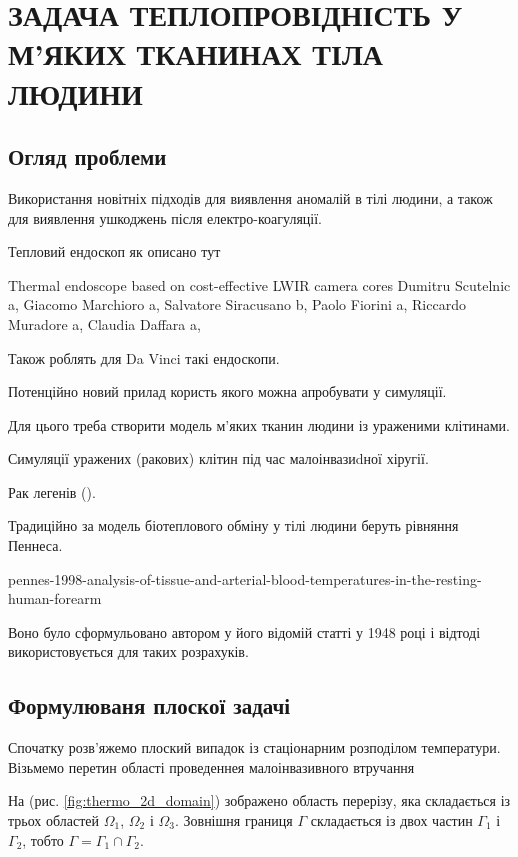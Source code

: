 \chapter{ЗАДАЧА ТЕПЛОПРОВІДНІСТЬ У М'ЯКИХ ТКАНИНАХ ТІЛА ЛЮДИНИ}

\nocite{bahvalov-et-al,benerdge-et-al,lung-cancer} 

\section{Огляд проблеми}

Використання новітніх підходів для виявлення аномалій в тілі людини, а також для виявлення ушкоджень після 
електро-коагуляції.

Тепловий ендоскоп як описано тут

Thermal endoscope based on cost-effective LWIR camera cores
Dumitru Scutelnic a, Giacomo Marchioro a, Salvatore Siracusano b, Paolo Fiorini a,
Riccardo Muradore a, Claudia Daffara a,

Також роблять для Da Vinci такі ендоскопи.

Потенційно новий прилад користь якого можна апробувати у симуляції.

Для цього треба створити модель м'яких тканин людини із ураженими клітинами. 

Симуляції уражених (ракових) клітин під час малоінвазиdної хіругії.

Рак легенів (\cite{lung-cancer}).

Традиційно за модель біотеплового обміну у тілі людини беруть рівняння Пеннеса.

pennes-1998-analysis-of-tissue-and-arterial-blood-temperatures-in-the-resting-human-forearm

Воно було сформульовано автором у його відомій статті у 1948 році і відтоді використовується для таких розрахуків.


\section{Формулюваня плоскої задачі}

Спочатку розв'яжемо плоский випадок із стаціонарним розподілом температури.
Візьмемо перетин області проведеннея малоінвазивного втручання

На (рис. \ref{fig:thermo_2d_domain}) зображено область перерізу, яка складається із трьох областей $\Omega_1$, 
$\Omega_2$ і $\Omega_3$. Зовнішня границя $\Gamma$ складається із двох частин $\Gamma_1$ і $\Gamma_2$, тобто 
$\Gamma=\Gamma_1\cap\Gamma_2$. 

